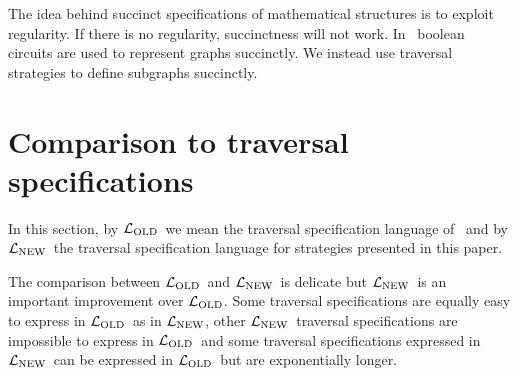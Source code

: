 The idea behind succinct specifications of mathematical structures
\cite{galperin:wigderson} is to exploit regularity. If there is no
regularity, succinctness will not work.  In~\cite{galperin:wigderson}
boolean circuits are used to represent graphs succinctly.  We instead
use traversal strategies to define subgraphs succinctly.

\section{Comparison to traversal specifications}
\label{sec-comparison}
\newcommand{\OLD}{$\cL_{\mathrm{OLD}}$}
\newcommand{\NEW}{$\cL_{\mathrm{NEW}}$}

In this section, by \OLD\ we mean the traversal specification language
of~\cite{karl:comp-enh,lieber-palsberg-xiao94} and by \NEW\ the traversal
specification language for strategies presented in this paper.

The comparison between \OLD\ and \NEW\ is delicate but \NEW\ is an
important improvement over \OLD. Some traversal specifications are
equally easy to express in \OLD\ as in \NEW, other \NEW\ traversal
specifications are impossible to express in \OLD\ and some traversal
specifications expressed in \NEW\ can be expressed in \OLD\ but are
exponentially longer.

